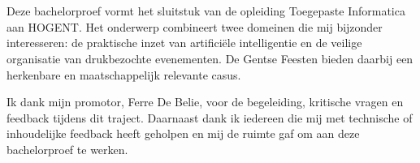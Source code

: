 
\chapter*{}%
\label{ch:voorwoord}

Deze bachelorproef vormt het sluitstuk van de opleiding Toegepaste Informatica aan HOGENT. Het onderwerp combineert twee domeinen die mij bijzonder interesseren: de praktische inzet van artificiële intelligentie en de veilige organisatie van drukbezochte evenementen. De Gentse Feesten bieden daarbij een herkenbare en maatschappelijk relevante casus.

Ik dank mijn promotor, Ferre De Belie, voor de begeleiding, kritische vragen en feedback tijdens dit traject. Daarnaast dank ik iedereen die mij met technische of inhoudelijke feedback heeft geholpen en mij de ruimte gaf om aan deze bachelorproef te werken.
